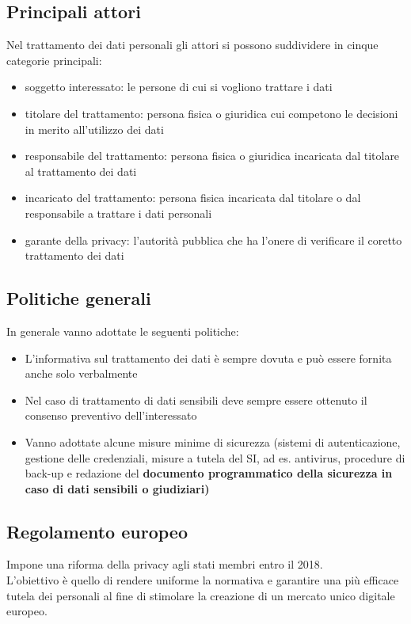 \subsection{Principali attori}
Nel trattamento dei dati personali gli attori si possono suddividere in cinque categorie principali:
\begin{itemize}
	\item soggetto interessato: le persone di cui si vogliono trattare i dati
	\item titolare del trattamento: persona fisica o giuridica cui competono le decisioni in merito
all’utilizzo dei dati
	\item responsabile del trattamento: persona fisica o giuridica incaricata dal titolare al trattamento dei dati
	\item incaricato del trattamento: persona fisica incaricata dal titolare o dal responsabile a trattare i dati personali
	\item garante della privacy: l'autorit\`a pubblica che ha l'onere di verificare il coretto trattamento dei dati
\end{itemize}

\subsection{Politiche generali}
In generale vanno adottate le seguenti politiche:
\begin{itemize}
	\item L'informativa sul trattamento dei dati \`e sempre dovuta e pu\`o essere fornita anche solo verbalmente
	\item Nel caso di trattamento di dati sensibili deve sempre essere ottenuto il consenso preventivo dell’interessato
	\item Vanno adottate alcune misure minime di sicurezza (sistemi di autenticazione, gestione delle credenziali, misure a tutela del SI, ad es. antivirus, procedure di back-up e redazione del \bf documento programmatico della sicurezza \rm in caso di dati sensibili o giudiziari)
\end{itemize}

\subsection{Regolamento europeo}
Impone una riforma della privacy agli stati membri entro il 2018.\\
L'obiettivo \`e quello di rendere uniforme la normativa e garantire una pi\`u efficace tutela dei personali al fine di stimolare la creazione di un mercato unico digitale europeo.

